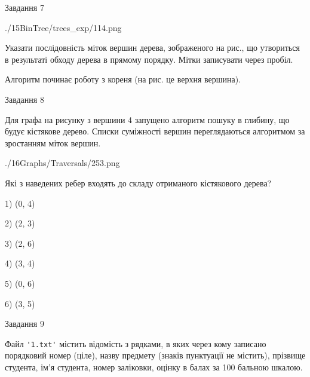 \documentclass[12pt, ukrainian]{article}
\def\code#1{\Verb!#1!}
\begin{document}
{\vspace{10mm}\par

\newpage
\begin{minipage}[t]{9.7cm}
               
{\begin{center}Завдання {7}\end{center}}
\vspace{-6mm}

\begin{center}
	{./15BinTree/trees_exp/114.png}
\end{center}
Указати послідовність міток вершин дерева, зображеного на рис., що утвориться в результаті обходу дерева в прямому порядку. Мітки записувати через пробіл.\par Алгоритм починає роботу з кореня (на рис. це верхня вершина).\par

\end{minipage}
\vline \hspace{8mm}
\begin{minipage}[t]{8.0cm}
               
{\begin{center}Завдання {8}\end{center}}
\vspace{-6mm}
Для графа на рисунку з вершини 4 запущено алгоритм пошуку в глибину, що будує кістякове дерево. Списки суміжності вершин переглядаються алгоритмом за зростанням міток вершин.\par
\begin{center}
	{./16Graphs/Traversals/253.png}
\end{center}
\par Які з наведених ребер входять до складу отриманого кістякового дерева?\par
1) (0, 4)\par
2) (2, 3)\par
3) (2, 6)\par
4) (3, 4)\par
5) (0, 6)\par
6) (3, 5)\par
{\vskip 15pt} \par

\end{minipage}

               
{\begin{center}Завдання {9}\end{center}}
\vspace{-6mm}
Файл \code{'1.txt'} містить відомість з рядками, в яких через кому записано поряд\-ковий номер (ціле), назву предмету (знаків пунктуації не містить), прізвище студента, ім'я студента, номер заліковки, оцінку в балах за 100 бальною шкалою.

}
\end{document}
